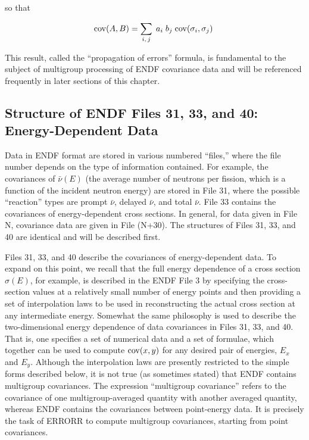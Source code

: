 \noindent
so that

\begin{equation}
{\rm cov}(A,B) = \sum_{i,\,j} \; a_i \; b_j \; {\rm cov}(\sigma_i , \sigma_j ) \
\label{e11}
\end{equation}

\noindent
This result, called the ``propagation of errors'' formula, is
fundamental to the subject of multigroup processing of ENDF covariance
data and will be referenced frequently in later sections of this
chapter.

\subsection{Structure of ENDF Files 31, 33, and 40: Energy-Dependent Data}
\label{ssERRORR_Str}

Data in ENDF format are stored in various numbered ``files,'' where the
file number depends on the type of information contained.  For example,
the covariances of $\bar{\nu}(E)$ (the average number of neutrons per
fission, which is a function of the incident neutron energy) are stored
in File 31, where the possible ``reaction'' types are prompt
$\bar{\nu}$, delayed $\bar{\nu}$, and total $\bar{\nu}$.  File 33
contains the covariances of energy-dependent cross sections.  In
general, for data given in File N, covariance data are given in
File (N+30).  The structures of Files 31, 33, and 40 are identical
and will be described first.

Files 31, 33, and 40 describe the covariances of energy-dependent data.  To
expand on this point, we recall that the full energy dependence of a
cross section $\sigma (E)$, for example, is described in the ENDF File
3 by specifying the cross-section values at a relatively small number
of energy points and then providing a set of interpolation laws to be
used in reconstructing the actual cross section at any intermediate
energy.  Somewhat the same philosophy is used to describe the
two-dimensional energy dependence of data covariances in Files 31, 33, and
40.  That is, one specifies a set of numerical data and a set of
formulae, which together can be used to compute ${\rm cov}(x,y)$ for
any desired pair of energies, $E_x$ and $E_y$.  Although
the interpolation laws are presently restricted to the simple forms
described below, it is not true (as sometimes stated) that ENDF
contains multigroup covariances.  The expression ``multigroup
covariance'' refers to the covariance of one multigroup-averaged
quantity with another averaged quantity, whereas ENDF contains the
covariances between point-energy data.  It is precisely the task of
ERRORR to compute multigroup covariances, starting from point
covariances.

